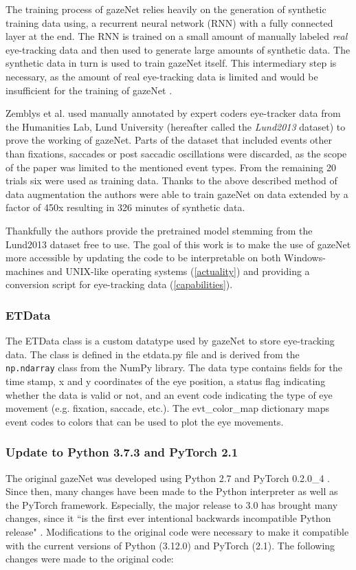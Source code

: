 \documentclass[acmlarge]{acmart}
\begin{document}
The training process of gazeNet relies heavily on the generation of synthetic training data using, a recurrent neural network (RNN) with a fully connected layer at the end. The RNN is trained on a small amount of manually labeled \emph{real} eye-tracking data and then used to generate large amounts of synthetic data. The synthetic data in turn is used to train gazeNet itself. This intermediary step is necessary, as the amount of real eye-tracking data is limited and would be insufficient for the training of gazeNet \cite{zemblys2018gazeNet}.

Zemblys et al. \cite{zemblys2018gazeNet} used manually annotated by expert coders eye-tracker data from the Humanities Lab, Lund University (hereafter called the \emph{Lund2013} dataset) to prove the working of gazeNet. Parts of the dataset that included events other than fixations, saccades or post saccadic oscillations were discarded, as the scope of the paper was limited to the mentioned event types. From the remaining 20 trials six were used as training data. Thanks to the above described method of data augmentation the authors were able to train gazeNet on data extended by a factor of 450x resulting in 326 minutes of synthetic data.

Thankfully the authors provide the pretrained model stemming from the Lund2013 dataset free to use. The goal of this work is to make the use of gazeNet more accessible by updating the code to be interpretable on both Windows-machines and UNIX-like operating systems (\ref{actuality}) and providing a conversion script for eye-tracking data (\ref{capabilities}).


\subsubsection{ETData}
The ETData class is a custom datatype used by gazeNet to store eye-tracking data. The class is defined in the etdata.py file and is derived from the \verb|np.ndarray| class from the NumPy library. The data type contains fields for the time stamp, x and y coordinates of the eye position, a status flag indicating whether the data is valid or not, and an event code indicating the type of eye movement (e.g. fixation, saccade, etc.). The evt\_color\_map dictionary maps event codes to colors that can be used to plot the eye movements.


\subsubsection{Update to Python 3.7.3 and PyTorch 2.1}
The original gazeNet was developed using Python 2.7 and PyTorch 0.2.0\_4 \cite{zemblys2018gazeNet}. Since then, many changes have been made to the Python interpreter as well as the PyTorch framework. Especially, the major release to 3.0 has brought many changes, since it ``is the first ever intentional backwards incompatible Python release" \cite{van_Rossum_2009}. Modifications to the original code were necessary to make it compatible with the current versions of Python (3.12.0) and PyTorch (2.1). The following changes were made to the original code:
\end{document}
